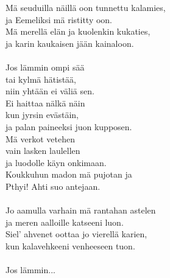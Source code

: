 
        Mä seuduilla näillä oon tunnettu kalamies, \\
        ja Eemeliksi mä ristitty oon. \\
        Mä merellä elän ja kuolenkin kukaties, \\
        ja karin kaukaisen jään kainaloon. \\
\hspace{10mm} \\
        Jos lämmin ompi sää \\
        tai kylmä hätistää, \\
        niin yhtään ei väliä sen. \\
        Ei haittaa nälkä näin \\
        kun jyrsin evästäin, \\
        ja palan paineeksi juon kupposen. \\
        Mä verkot vetehen \\
        vain lasken laulellen \\
        ja luodolle käyn onkimaan. \\
        Koukkuhun madon mä pujotan ja \\
        Pthyi! Ahti suo antejaan. \\
\hspace{10mm} \\
        Jo aamulla varhain mä rantahan astelen \\
        ja meren aalloille katseeni luon. \\
        Siel' ahvenet oottaa jo vierellä karien, \\
        kun kalavehkeeni venheeseen tuon. \\
\hspace{10mm} \\
        Jos lämmin... \\
